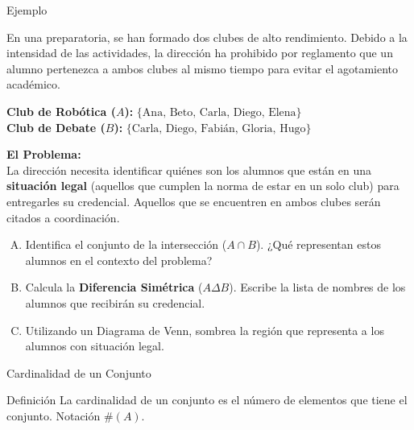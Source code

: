\documentclass[aspectratio=169]{beamer}
\begin{document}
\begin{frame}[t]{Ejemplo}
\small

En una preparatoria, se han formado dos clubes de alto rendimiento. Debido a la intensidad de las actividades, la dirección ha prohibido por reglamento que un alumno pertenezca a ambos clubes al mismo tiempo para evitar el agotamiento académico.

\begin{center}
    \textbf{Club de Robótica ($A$):} $\{ \text{Ana, Beto, Carla, Diego, Elena} \}$ \\
    \textbf{Club de Debate ($B$):} $\{ \text{Carla, Diego, Fabián, Gloria, Hugo} \}$
\end{center}

\textbf{El Problema:} \\
La dirección necesita identificar quiénes son los alumnos que están en una \textbf{situación legal} (aquellos que cumplen la norma de estar en un solo club) para entregarles su credencial. Aquellos que se encuentren en ambos clubes serán citados a coordinación.
\begin{enumerate}[A)]
    \item Identifica el conjunto de la intersección ($A \cap B$). ¿Qué representan estos alumnos en el contexto del problema?
    \item Calcula la \textbf{Diferencia Simétrica} ($A \Delta B$). Escribe la lista de nombres de los alumnos que recibirán su credencial.
    \item Utilizando un Diagrama de Venn, sombrea la región que representa a los alumnos con situación legal.
    
\end{enumerate}

\end{frame}


\begin{frame}{Cardinalidad de un Conjunto}
\begin{block}{Definición}
    La cardinalidad de un conjunto es el número de elementos que tiene el conjunto. Notación $\#(A)$.
\end{block}

\begin{columns}[onlytextwidth]






\end{columns}

\end{frame}
\end{document}

